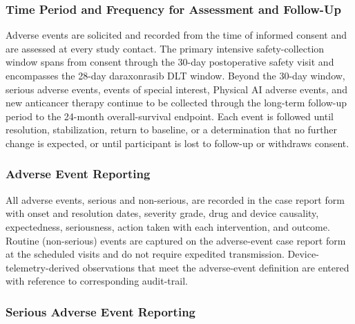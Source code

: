 \subsubsection{Time Period and Frequency for Assessment and Follow-Up}

Adverse events are solicited and recorded from the time of informed consent and are
assessed at every study contact. The primary intensive safety-collection window
spans from consent through the 30-day postoperative safety visit and encompasses the
28-day daraxonrasib DLT window. Beyond the 30-day window, serious adverse events,
events of special interest, Physical AI adverse events, and new anticancer therapy
continue to be collected through the long-term follow-up period to the 24-month
overall-survival endpoint. Each event is followed until resolution, stabilization,
return to baseline, or a determination that no further change is expected, or until participant is lost to follow-up or withdraws consent.

\subsubsection{Adverse Event Reporting}

All adverse events, serious and non-serious, are recorded in the case report form
with onset and resolution dates, severity grade, drug and device causality,
expectedness, seriousness, action taken with each intervention, and outcome. Routine
(non-serious) events are captured on the adverse-event case report form at the
scheduled visits and do not require expedited transmission. Device-telemetry-derived
observations that meet the adverse-event definition are entered with reference to
corresponding audit-trail.

\subsubsection{Serious Adverse Event Reporting}

